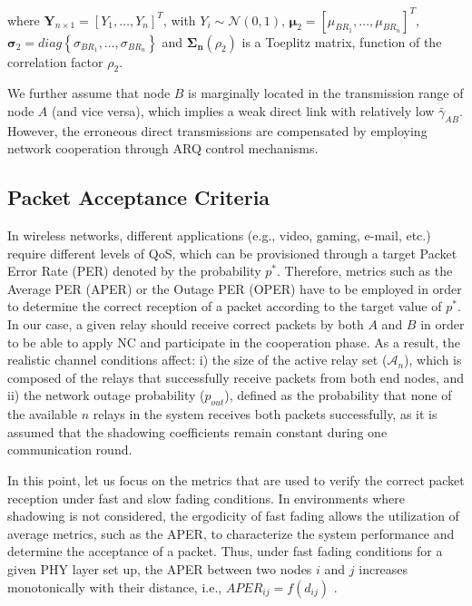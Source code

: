 \documentclass[12pt,draftcls, onecolumn]{IEEEtran}
\begin{document}
\noindent where $\textbf{Y}_{n\times 1} = \left[Y_1,\ldots,Y_n\right]^T$, with $Y_i\sim \mathcal{N}(0,1)$, $\mathbf{\mu}_2 = \left[\mu_{BR_{1}},\ldots,\mu_{BR_{n}}\right]^T$, $\mathbf{\sigma}_2=diag\left\{\sigma_{BR_{1}},\ldots,\sigma_{BR_{n}}\right\}$ and $\mathbf{\Sigma_n}\left(\rho_2\right)$ is a Toeplitz matrix, function of the correlation factor $\rho_2$.

We further assume that node $B$ is marginally located in the transmission range of node $A$ (and vice versa), which implies a weak direct link with relatively low $\bar{\gamma}_{AB}$. However, the erroneous direct transmissions are compensated by employing network cooperation through ARQ control mechanisms.

\subsection{Packet Acceptance Criteria}
\label{sec:criteria}

In wireless networks, different applications (e.g., video, gaming, e-mail, etc.) require different levels of QoS, which can be provisioned through a target Packet Error Rate (PER) denoted by the probability $p^*$. Therefore, metrics such as the Average PER (APER) or the Outage PER (OPER) have to be employed in order to determine the correct reception of a packet according to the target value of $p^*$. In our case, a given relay should receive correct packets by both $A$ and $B$ in order to be able to apply NC and participate in the cooperation phase. As a result, the realistic channel conditions affect: i) the size of the active relay set ($\mathcal{A}_n$), which is composed of the relays that successfully receive packets from both end nodes, and ii) the network outage probability ($p_{out}$), defined as the probability that none of the available $n$ relays in the system receives both packets successfully, as it is assumed that the shadowing coefficients remain constant during one communication round.

In this point, let us focus on the metrics that are used to verify the correct packet reception under fast and slow fading conditions. In environments where shadowing is not considered, the ergodicity of fast fading allows the utilization of average metrics, such as the APER, to characterize the system performance and determine the acceptance of a packet. Thus, under fast fading conditions for a given PHY layer set up, the APER between two nodes $i$ and $j$ increases monotonically with their distance, i.e., $APER_{ij} = f(d_{ij})$ \cite{5288484}.
\end{document}

